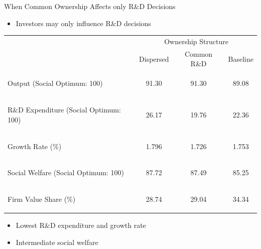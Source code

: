 \documentclass[english,aspectratio=169,handout]{beamer}
\makeatletter
\theoremstyle{plain}
\newenvironment{cellvarwidth}[1][t]
  {\begin{varwidth}[#1]{\linewidth}}
  {\@finalstrut\@arstrutbox\end{varwidth}}
\makeatother
\begin{document}
\begin{frame}{When Common Ownership Affects only R\&D Decisions}
  \begin{itemize}
    \item Investors may only influence R\&D decisions \citep{d-Aspremont1988-je}
  \end{itemize}
  \begin{center}
    \setlength{\tabcolsep}{3pt}
    \begin{tabular}{@{} l c c c @{}} %
      \toprule
      \multirow{2}{*}{%
        \begin{cellvarwidth}[t]\centering

        \end{cellvarwidth}%
      }
      & \multicolumn{3}{c}{Ownership Structure} \\
      \cmidrule(lr){2-4}
         & Dispersed
         & {\color{blue} Common R\&D}
         & Baseline \\

      \midrule
      \begin{cellvarwidth}[t]\raggedright
        Output (Social Optimum: 100)
      \end{cellvarwidth} &
      91.30 & {\color{blue}91.30} & 89.08 \\

      \midrule
      \begin{cellvarwidth}[t]\raggedright
        R\&D Expenditure (Social Optimum: 100)
      \end{cellvarwidth} &
      26.17 & {\color{blue}19.76} & 22.36 \\

      \midrule
      \begin{cellvarwidth}[t]\raggedright
        Growth Rate (\%)
      \end{cellvarwidth} &
      1.796 & {\color{blue}1.726} & 1.753\\

      \midrule
      \begin{cellvarwidth}[t]\raggedright
        Social Welfare (Social Optimum: 100)
      \end{cellvarwidth} &
      87.72 & {\color{blue}87.49} & 85.25 \\

      \midrule
      \begin{cellvarwidth}[t]\raggedright
        Firm Value Share (\%)
      \end{cellvarwidth} &
      28.74 & {\color{blue}29.04} & 34.34 \\

      \bottomrule
    \end{tabular}
  \end{center}
  \begin{itemize}
      \item Lowest R\&D expenditure and growth rate
      \item Intermediate social welfare
  \end{itemize}
\end{frame}
\end{document}
